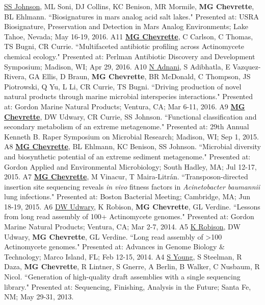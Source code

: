 \begin{cvpubs}
  \cvpub
    {\underline{SS Johnson}, ML Soni, DJ Collins, KC Benison, MR Mormile, \textbf{MG Chevrette}, BL Ehlmann. ``Biosignatures in mars analog acid salt lakes." Presented at: USRA Biosignature, Preservation and Detection in Mars Analog Environments; Lake Tahoe, Nevada; May 16-19, 2016.} %
    {A11} %
  \cvpub
    {\textbf{\underline{MG Chevrette}}, C Carlson, C Thomas, TS Bugni, CR Currie. ``Multifaceted antibiotic profiling across Actinomycete chemical ecology." Presented at: Perlman Antibiotic Discovery and Development Symposium; Madison, WI; Apr 29, 2016.} %
    {A10} %
  \cvpub
    {\underline{N Adnani}, S Adibhatla, E Vazquez-Rivera, GA Ellis, D Braun, \textbf{MG Chevrette}, BR McDonald, C Thompson, JS Piotrowski, Q Yu, L Li, CR Currie, TS Bugni. ``Driving production of novel natural products through marine microbial interspecies interactions." Presented at: Gordon Marine Natural Products; Ventura, CA; Mar 6-11, 2016.} %
    {A9} %
  \cvpub
    {\textbf{\underline{MG Chevrette}}, DW Udwary, CR Currie, SS Johnson. ``Functional classification and secondary metabolism of an extreme metagenome." Presented at: 29th Annual Kenneth B. Raper Symposium on Microbial Research; Madison, WI; Sep 1, 2015.} %
    {A8} %
  \cvpub
    {\textbf{\underline{MG Chevrette}}, BL Ehlmann, KC Benison, SS Johnson. ``Microbial diversity and biosynthetic potential of an extreme sediment metagenome." Presented at: Gordon Applied and Environmental Microbiology; South Hadley, MA; Jul 12-17, 2015.} %
    {A7} %
  \cvpub
    {\textbf{\underline{MG Chevrette}}, M Vinacur, T Maira-Litr\'{a}n. ``Transposon-directed insertion site sequencing reveals \textit{in vivo} fitness factors in \textit{Acinetobacter baumannii} lung infections." Presented at: Boston Bacterial Meeting; Cambridge, MA; Jun 18-19, 2015.} %
    {A6} %
  \cvpub
    {\underline{DW Udwary}, K Robison, \textbf{MG Chevrette}, GL Verdine. ``Lessons from long read assembly of 100+ Actinomycete genomes." Presented at: Gordon Marine Natural Products; Ventura, CA; Mar 2-7, 2014.} %
    {A5} %
  \cvpub
    {\underline{K Robison}, DW Udwary, \textbf{MG Chevrette}, GL Verdine. ``Long read assembly of >100 Actinomycete genomes." Presented at: Advances in Genome Biology \& Technology; Marco Island, FL; Feb 12-15, 2014.} %
    {A4} %
  \cvpub
    {\underline{S Young}, S Steelman, R Daza, \textbf{MG Chevrette}, R Lintner, S Gnerre, A Berlin, B Walker, C Nusbaum, R Nicol. ``Generation of high-quality draft assemblies with a single sequencing library." Presented at: Sequencing, Finishing, Analysis in the Future; Santa Fe, NM; May 29-31, 2013.} %

\end{cvpubs}
